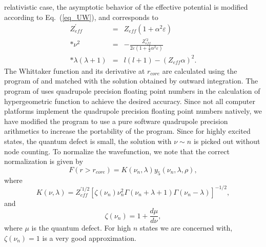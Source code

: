 relativistic case, the asymptotic behavior of the effective potential is
modified according to Eq.~(\ref{eq_UW}), and corresponds to 
\begin{eqnarray}
Z_{eff}^\prime &=& Z_{eff}(1+\alpha^2\varepsilon) \nonumber\\*
\nu^2 &=& -\frac{Z_{eff}^{\prime 2}}{2\varepsilon
\left(1+\frac{1}{2}\alpha^2\varepsilon\right)} \nonumber\\*
\lambda(\lambda+1) &=& l(l+1) - (Z_{eff}\alpha)^2 .
\end{eqnarray}
The Whittaker function and its derivative at $r_{core}$ are calculated
using the program of \citet{thompson85} and matched with the solution
obtained by outward integration. The program of \citet{thompson85} uses
quadrupole precision floating point numbers in the calculation of 
hypergeometric function to achieve the desired accuracy. Since not all computer
platforms implement the quadrupole precision floating point numbers natively,
we have modified the program to use a pure software quadrupole precision
arithmetics to increase the portability of the
program. Since for highly excited states, the quantum defect is 
small, the solution with $\nu \sim n$ is picked out without node counting. To
normalize the wavefunction, we note that the correct normalization is given by
\cite{seaton58}
\begin{equation}
\label{eq_norm}
F(r > r_{core}) = K(\nu_n, \lambda)y_5(\nu_n, \lambda, \rho),
\end{equation}
where 
\begin{equation}
K(\nu,\lambda) =
Z_{eff}^{\prime 1/2}\left[\zeta(\nu_n)\nu_n^2\Gamma(\nu_n+\lambda+1)
\Gamma(\nu_n-\lambda)\right]^{-1/2}, 
\end{equation}
and 
\begin{equation}
\zeta(\nu_n) = 1 + \frac{d\mu}{d\nu},
\end{equation}
where $\mu$ is the quantum defect. For high $n$ states we are concerned with,
$\zeta(\nu_n) = 1$ is a very good approximation.

